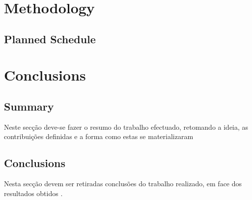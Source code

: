 \documentclass{llncs}
\begin{document}
\section{Methodology}\label{meth} %



		



	\subsection{Planned Schedule} %
		

\section{Conclusions}\label{concl} %


\subsection{Summary} %
Neste secção deve-se fazer o resumo do trabalho efectuado, retomando a ideia, as contribuições definidas e a forma como estas se materializaram

\subsection{Conclusions} %
Nesta secção devem ser retiradas conclusões do trabalho realizado, em face dos resultados obtidos \cite{exemplo}.




\end{document}
